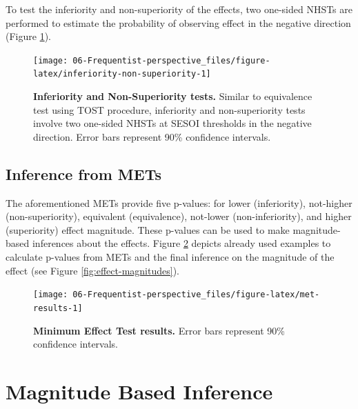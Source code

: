 \documentclass[
]{book}
\begin{document}
To test the inferiority and non-superiority of the effects, two one-sided NHSTs are performed to estimate the probability of observing effect in the negative direction (Figure \ref{fig:inferiority-non-superiority}).

\begin{figure}

{\centering \texttt{[image: 06-Frequentist-perspective\_files/figure-latex/inferiority-non-superiority-1]} 

}

\caption{\textbf{Inferiority and Non-Superiority tests. }Similar to equivalence test using TOST procedure, inferiority and non-superiority tests involve two one-sided NHSTs at SESOI thresholds in the negative direction. Error bars represent 90\% confidence intervals.}\label{fig:inferiority-non-superiority}
\end{figure}



\hypertarget{inference-from-mets}{%
\subsection{Inference from METs}\label{inference-from-mets}}

The aforementioned METs provide five p-values: for lower (inferiority), not-higher (non-superiority), equivalent (equivalence), not-lower (non-inferiority), and higher (superiority) effect magnitude. These p-values can be used to make magnitude-based inferences about the effects. Figure \ref{fig:met-results} depicts already used examples to calculate p-values from METs and the final inference on the magnitude of the effect (see Figure \ref{fig:effect-magnitudes}).

\begin{figure}

{\centering \texttt{[image: 06-Frequentist-perspective\_files/figure-latex/met-results-1]} 

}

\caption{\textbf{Minimum Effect Test results. }Error bars represent 90\% confidence intervals.}\label{fig:met-results}
\end{figure}



\hypertarget{magnitude-based-inference}{%
\section{Magnitude Based Inference}\label{magnitude-based-inference}}
\end{document}
